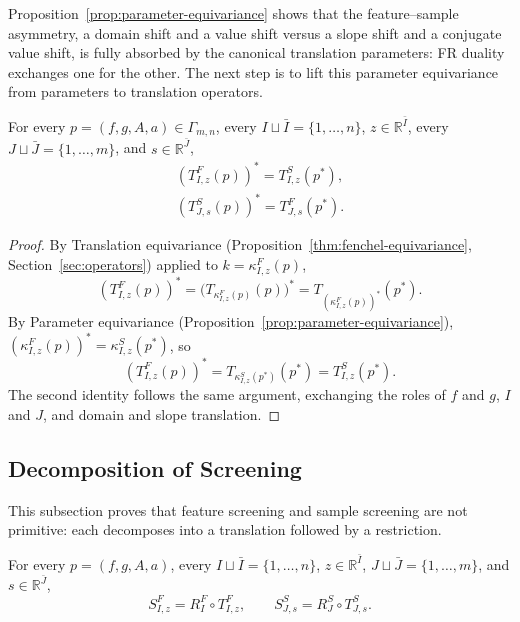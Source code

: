 Proposition~\ref{prop:parameter-equivariance} shows that the
feature--sample asymmetry, a domain shift and a value shift versus a
slope shift and a conjugate value shift, is fully absorbed by the
canonical translation parameters: FR duality exchanges one for the
other. The next step is to lift this parameter equivariance from
parameters to translation operators.

\begin{proposition}
\label{prop:translation-equivariance-screening}
For every \(p=(f,g,A,a)\in\Gamma_{m,n}\), every
\(I\sqcup\bar I=\{1,\ldots,n\}\), \(z\in\mathbb R^{\bar I}\), every
\(J\sqcup\bar J=\{1,\ldots,m\}\), and \(s\in\mathbb R^{\bar J}\),
\begin{align*}
        (T^F_{I, z}(p))^* = T^S_{I, z}(p^*),\\
        (T^S_{J, s}(p))^* = T^F_{J, s}(p^*).
\end{align*}
\end{proposition}

\begin{proof}
By Translation equivariance (Proposition~\ref{thm:fenchel-equivariance},
Section~\ref{sec:operators}) applied to \(k=\kappa^F_{I,z}(p)\),
\[
(T^F_{I,z}(p))^*
=
\bigl(T_{\kappa^F_{I,z}(p)}(p)\bigr)^*
=
T_{(\kappa^F_{I,z}(p))^*}(p^*).
\]
By Parameter equivariance (Proposition~\ref{prop:parameter-equivariance}),
\((\kappa^F_{I,z}(p))^*=\kappa^S_{I,z}(p^*)\), so
\[
(T^F_{I,z}(p))^*
=
T_{\kappa^S_{I,z}(p^*)}(p^*)
=
T^S_{I,z}(p^*).
\]
The second identity follows the same argument, exchanging the roles of
\(f\) and \(g\), \(I\) and \(J\), and domain and slope translation.
\end{proof}




\subsection{Decomposition of Screening}

This subsection proves that feature screening and sample screening are
not primitive: each decomposes into a translation followed by a
restriction. 


\begin{theorem}
\label{thm:decomposition}
For every \(p=(f,g,A,a)\), every \(I\sqcup\bar I=\{1,\ldots,n\}\),
\(z\in\mathbb R^{\bar I}\), \(J\sqcup\bar J=\{1,\ldots,m\}\), and
\(s\in\mathbb R^{\bar J}\),
\[
S^{F}_{I,z}
=
R^{F}_{I}\circ T^{F}_{I,z},
\qquad
S^{S}_{J,s}
=
R^{S}_{J}\circ T^{S}_{J,s}.
\]
\end{theorem}

